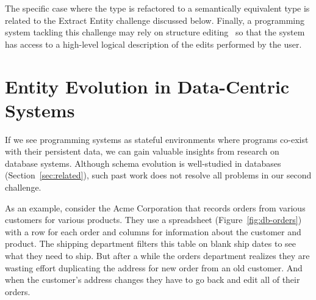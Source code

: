 \documentclass[english,crc]{programming}
\begin{document}
The specific case where the type is refactored to a semantically equivalent type is related to
the Extract Entity challenge discussed below. Finally, a programming system tackling this
challenge may rely on structure editing~\cite{Teitelbaum81} so that the system has access to a high-level logical
description of the edits performed by the user.


\section{Entity Evolution in Data-Centric Systems}
If we see programming systems as stateful environments where programs co-exist with their persistent
data, we can gain valuable insights from research on database systems.
Although schema evolution is well-studied in databases (Section~\ref{sec:related}), such past work
does not resolve all problems in our second challenge.

As an example, consider the Acme Corporation that records orders from various customers for
various products. They use a spreadsheet (Figure~\ref{fig:db-orders}) with a row for each order
and columns for information about the customer and product. The shipping department filters this
table on blank ship dates to see what they need to ship. But after a while the orders department
realizes they are wasting effort duplicating the address for new order from an old customer. And
when the customer's address changes they have to go back and edit all of their orders.
\end{document}
